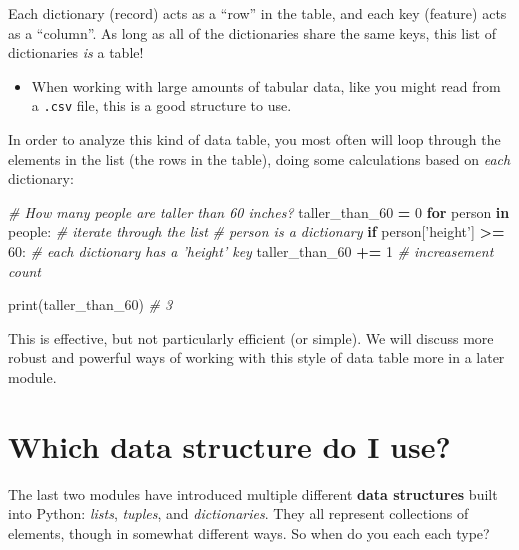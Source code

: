 \documentclass[]{book}
\newenvironment{Shaded}{\begin{snugshade}}{\end{snugshade}}
\newcommand{\KeywordTok}[1]{\textcolor[rgb]{0.13,0.29,0.53}{\textbf{#1}}}
\newcommand{\DecValTok}[1]{\textcolor[rgb]{0.00,0.00,0.81}{#1}}
\newcommand{\StringTok}[1]{\textcolor[rgb]{0.31,0.60,0.02}{#1}}
\newcommand{\CommentTok}[1]{\textcolor[rgb]{0.56,0.35,0.01}{\textit{#1}}}
\newcommand{\ControlFlowTok}[1]{\textcolor[rgb]{0.13,0.29,0.53}{\textbf{#1}}}
\newcommand{\OperatorTok}[1]{\textcolor[rgb]{0.81,0.36,0.00}{\textbf{#1}}}
\newcommand{\BuiltInTok}[1]{#1}
\newcommand{\NormalTok}[1]{#1}
\providecommand{\tightlist}{%
  \setlength{\itemsep}{0pt}\setlength{\parskip}{0pt}}
\begin{document}
Each dictionary (record) acts as a ``row'' in the table, and each key
(feature) acts as a ``column''. As long as all of the dictionaries share
the same keys, this list of dictionaries \emph{is} a table!

\begin{itemize}
\tightlist
\item
  When working with large amounts of tabular data, like you might read
  from a \texttt{.csv} file, this is a good structure to use.
\end{itemize}

In order to analyze this kind of data table, you most often will loop
through the elements in the list (the rows in the table), doing some
calculations based on \emph{each} dictionary:

\begin{Shaded}
\begin{Highlighting}[]
\CommentTok{# How many people are taller than 60 inches?}
\NormalTok{taller_than_60 }\OperatorTok{=} \DecValTok{0}
\ControlFlowTok{for}\NormalTok{ person }\KeywordTok{in}\NormalTok{ people:  }\CommentTok{# iterate through the list}
    \CommentTok{# person is a dictionary}
    \ControlFlowTok{if}\NormalTok{ person[}\StringTok{'height'}\NormalTok{] }\OperatorTok{>=} \DecValTok{60}\NormalTok{:  }\CommentTok{# each dictionary has a 'height' key}
\NormalTok{        taller_than_60 }\OperatorTok{+=} \DecValTok{1}  \CommentTok{# increasement count}

\BuiltInTok{print}\NormalTok{(taller_than_60)  }\CommentTok{# 3}
\end{Highlighting}
\end{Shaded}

This is effective, but not particularly efficient (or simple). We will
discuss more robust and powerful ways of working with this style of data
table more in a later module.

\hypertarget{which-data-structure-do-i-use}{\section{Which data
structure do I use?}\label{which-data-structure-do-i-use}}

The last two modules have introduced multiple different \textbf{data
structures} built into Python: \emph{lists}, \emph{tuples}, and
\emph{dictionaries}. They all represent collections of elements, though
in somewhat different ways. So when do you each each type?
\end{document}
